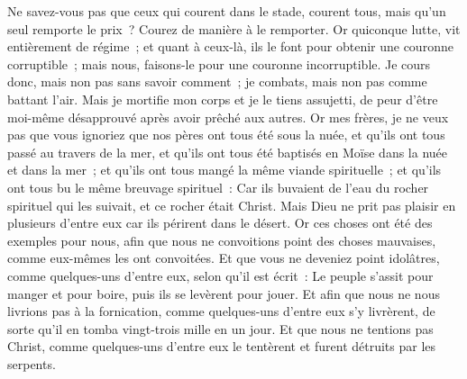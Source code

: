 \begin{multicols}{2}
Ne savez-vous pas que ceux qui courent dans le stade, courent tous, mais qu'un seul remporte le prix~? Courez de manière à le remporter.
Or quiconque lutte, vit entièrement de régime~; et quant à ceux-là, ils le font pour obtenir une couronne corruptible~; mais nous, faisons-le pour une couronne incorruptible.
Je cours donc, mais non pas sans savoir comment~; je combats, mais non pas comme battant l'air.
Mais je mortifie mon corps et je le tiens assujetti, de peur d'être moi-même désapprouvé après avoir prêché aux autres.
\VerseOne{}Or mes frères, je ne veux pas que vous ignoriez que nos pères ont tous été sous la nuée, et qu'ils ont tous passé au travers de la mer,
et qu'ils ont tous été baptisés en Moïse dans la nuée et dans la mer~;
et qu'ils ont tous mangé la même viande spirituelle~;
et qu'ils ont tous bu le même breuvage spirituel~: Car ils buvaient de l'eau du rocher spirituel qui les suivait, et ce rocher était Christ.
Mais Dieu ne prit pas plaisir en plusieurs d'entre eux car ils périrent dans le désert.
Or ces choses ont été des exemples pour nous, afin que nous ne convoitions point des choses mauvaises, comme eux-mêmes les ont convoitées.
Et que vous ne deveniez point idolâtres, comme quelques-uns d'entre eux, selon qu'il est écrit~: Le peuple s'assit pour manger et pour boire, puis ils se levèrent pour jouer.
Et afin que nous ne nous livrions pas à la fornication, comme quelques-uns d'entre eux s'y livrèrent, de sorte qu'il en tomba vingt-trois mille en un jour.
Et que nous ne tentions pas Christ, comme quelques-uns d'entre eux le tentèrent et furent détruits par les serpents.

\end{multicols}
